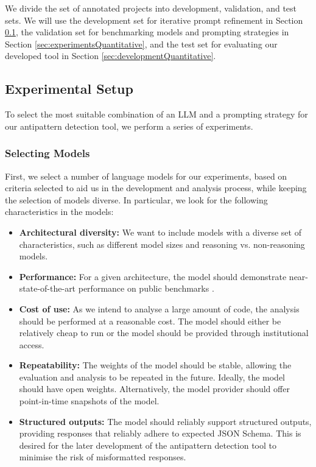 \documentclass{article}
\begin{document}
We divide the set of annotated projects into development, validation, and test sets. We will use the development set for iterative prompt refinement in Section \ref{sec:experiments}, the validation set for benchmarking models and prompting strategies in Section \ref{sec:experimentsQuantitative}, and the test set for evaluating our developed tool in Section \ref{sec:developmentQuantitative}.

\subsection{Experimental Setup}\label{sec:experiments}

To select the most suitable combination of an LLM and a prompting strategy for our antipattern detection tool, we perform a series of experiments. 

\subsubsection{Selecting Models}

First, we select a number of language models for our experiments, based on criteria selected to aid us in the development and analysis process, while keeping the selection of models diverse. In particular, we look for the following characteristics in the models:

\begin{itemize}
    \item \textbf{Architectural diversity:} We want to include models with a diverse set of characteristics, such as different model sizes and reasoning vs. non-reasoning models.
    \item \textbf{Performance:} For a given architecture, the model should demonstrate near-state-of-the-art performance on public benchmarks \cite{artificialAnalysis}.
    \item \textbf{Cost of use:} As we intend to analyse a large amount of code, the analysis should be performed at a reasonable cost. The model should either be relatively cheap to run or the model should be provided through institutional access.
    \item \textbf{Repeatability:} The weights of the model should be stable, allowing the evaluation and analysis to be repeated in the future. Ideally, the model should have open weights. Alternatively, the model provider should offer point-in-time snapshots of the model.
    \item \textbf{Structured outputs:} The model should reliably support structured outputs, providing responses that reliably adhere to expected JSON Schema. This is desired for the later development of the antipattern detection tool to minimise the risk of misformatted responses.
\end{itemize}
\end{document}
